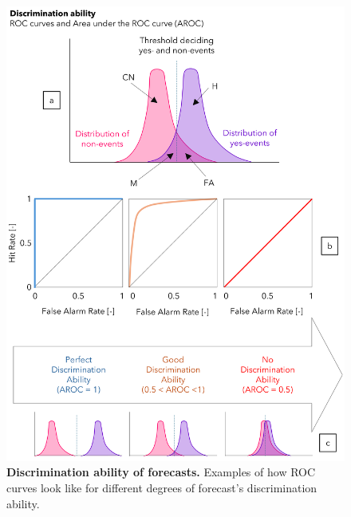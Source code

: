\begin{figure}[htbp]
\centering
\includegraphics[width=\textwidth]{roc_examples.png}
\caption{\textbf{Discrimination ability of forecasts.} Examples of how ROC curves look like for different degrees of forecast's discrimination ability.}
\label{fig:roc_examples}
\end{figure}

